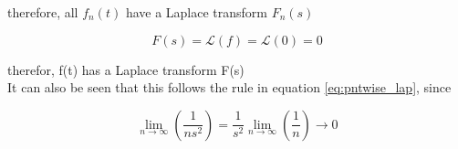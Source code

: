 \documentclass[a4paper,10pt,reqno]{amsart}
\numberwithin{equation}{section}
\newcommand{\lap}{\mathscr{L}}
\begin{document}
therefore, all $f_n(t)$ have a Laplace transform $F_n(s)$

\begin{equation}
     F(s) = \lap(f) = \lap(0) = 0
\end{equation}

therefor, f(t) has a Laplace transform F(s) \\

It can also be seen that this follows the rule in equation \ref{eq:pntwise_lap}, since

\begin{equation*}
     \lim_{n \to \infty} \left(\frac{1}{ns^2}\right) = \frac{1}{s^2} \lim_{n \to \infty} \left(\frac{1}{n}\right) \to 0
\end{equation*}
\end{document}
